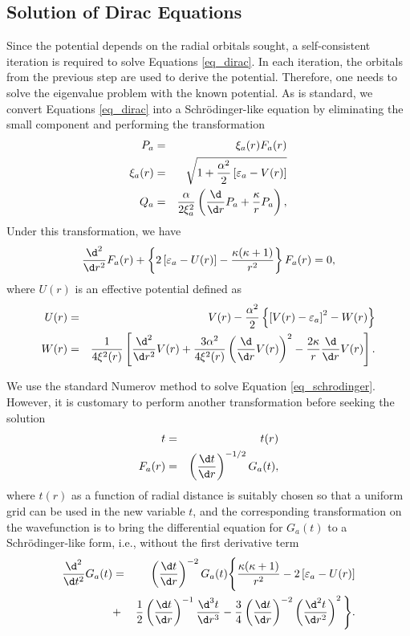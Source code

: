 \documentclass{elsart}
\begin{document}
\subsection{Solution of Dirac Equations}
Since the potential depends on the radial orbitals sought, a self-consistent
iteration is required to solve Equations \ref{eq_dirac}. In each iteration,
the orbitals from the previous step are used to derive the
potential. Therefore, one needs to solve the eigenvalue problem with the known
potential. As is 
standard, we convert Equations \ref{eq_dirac} into a Schr\"{o}dinger-like
equation by 
eliminating the small component and performing the transformation
\citep{chernysheva99} 
\begin{eqnarray}
\label{eq_transform}
P_a &=& \xi_a(r) F_a(r) \nonumber \\
\xi_a(r) &=& \sqrt{1+\frac{\alpha^2}{2}\left[\varepsilon_a-V(r)\right]} 
\nonumber \\
Q_a &=& \frac{\alpha}{2\xi_a^2}\left(\frac{\d}{\d r}P_a + 
\frac{\kappa}{r}P_a\right),
\end{eqnarray}
Under this transformation, we have
\begin{equation}
\label{eq_schrodinger}
\frac{\d^2}{\d r^2}F_a(r) + \left\{2\left[\varepsilon_a-U(r)\right] - 
\frac{\kappa(\kappa + 1)}{r^2}\right\}F_a(r) = 0,
\end{equation}
where $U(r)$ is an effective potential defined as
\begin{eqnarray} 
\label{eq_UW}
U(r) &=& V(r) - \frac{\alpha^2}{2}\left\{\left[V(r) - \varepsilon_a\right]^2 
-W(r)\right\} \nonumber \\
W(r) &=& \frac{1}{4\xi^2(r)}\left[\frac{\d^2}{\d r^2}V(r) +
\frac{3\alpha^2}{4\xi^2(r)}\left(\frac{\d}{\d r}V(r)\right)^2 - 
\frac{2\kappa}{r}\frac{\d}{\d r}V(r)\right].
\end{eqnarray}

We use the standard Numerov method to solve Equation \ref{eq_schrodinger}. 
However, it is customary to perform another transformation before seeking the
solution
\begin{eqnarray}
t &=& t(r) \nonumber\\
F_a(r) &=& \left(\frac{\d t}{\d r}\right)^{-1/2} G_a(t),
\end{eqnarray}
where $t(r)$ as a function of radial distance is suitably chosen
so that a uniform grid can be used in the new variable $t$, and the
corresponding transformation on the wavefunction is to bring the differential
equation for $G_a(t)$ to a Schr\"{o}dinger-like form, i.e., without the first
derivative term
\begin{eqnarray}
\label{eq_Ga}
\frac{\d^2}{\d t^2}G_a(t) &=& \left(\frac{\d t}{\d r}\right)^{-2}G_a(t)
\Bigg\{\frac{\kappa(\kappa +1)}{r^2} - 2\left[\varepsilon_a-U(r)\right]
\nonumber\\
&+&\frac{1}{2}\left(\frac{\d t}{\d r}\right)^{-1}\frac{\d^3 t}{\d r^3}
-\frac{3}{4}\left(\frac{\d t}{\d r}\right)^{-2}\left(\frac{\d^2 t}{\d
r^2}\right)^2\Bigg\}.
\end{eqnarray}
\end{document}
